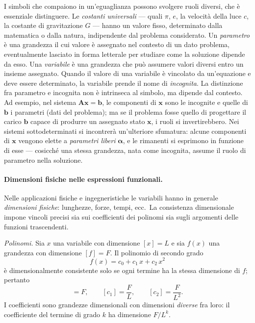 I simboli che compaiono in un'eguaglianza possono svolgere ruoli diversi, che \`e essenziale distinguere. Le \textit{costanti
	universali} --- quali $\pi$, $e$, la velocit\`a della luce $c$, la	costante di gravitazione $G$ --- hanno un valore fisso, determinato	dalla matematica o dalla natura, indipendente dal problema	considerato. Un \textit{parametro} \`e una grandezza il cui valore \`e	assegnato nel contesto di un dato problema, eventualmente lasciato in	forma letterale per studiare come la soluzione dipende da esso. Una \textit{variabile} \`e una grandezza che pu\`o assumere valori	diversi entro un insieme assegnato. Quando il valore di una	variabile \`e vincolato da un'equazione e deve essere determinato,	la variabile prende il nome di \textit{incognita}. La distinzione fra parametro e	incognita non \`e intrinseca al simbolo, ma dipende dal contesto. Ad esempio, nel sistema $\bm{A}\bm{x}=\bm{b}$, le componenti di	$\bm{x}$ sono le incognite e quelle di $\bm{b}$ i parametri (dati del problema); ma se il problema fosse quello di progettare il carico	$\bm{b}$ capace di produrre un assegnato stato $\bm{x}$, i ruoli si	invertirebbero. Nei sistemi sottodeterminati si incontrer\`a	un'ulteriore sfumatura: alcune componenti di $\bm{x}$ vengono elette	a \textit{parametri liberi} $\bm{\alpha}$, e le rimanenti si esprimono	in funzione di esse --- cosicch\'e una stessa grandezza, nata come	incognita, assume il ruolo di parametro nella soluzione.


\paragraph{Dimensioni fisiche nelle espressioni funzionali.}
Nelle applicazioni fisiche e ingegneristiche le variabili hanno in generale
\emph{dimensioni fisiche}: lunghezze, forze, tempi, ecc.\ La consistenza
dimensionale impone vincoli precisi sia sui coefficienti dei polinomi sia
sugli argomenti delle funzioni trascendenti.

\textit{Polinomi.}
Sia $x$ una variabile con dimensione $[x] = L$ e sia $f(x)$ una
grandezza con dimensione $[f] = F$. Il polinomio di secondo grado
\begin{equation}
	f(x) = c_0 + c_1\,x + c_2\,x^2
\end{equation}
è dimensionalmente consistente solo se ogni termine ha la stessa dimensione
di $f$; pertanto
\begin{equation}
	[c_0] = F, \qquad
	[c_1] = \frac{F}{L}, \qquad
	[c_2] = \frac{F}{L^2}.
\end{equation}
I coefficienti sono grandezze dimensionali con dimensioni \emph{diverse} fra
loro: il coefficiente del termine di grado $k$ ha dimensione
$F/L^k$.

